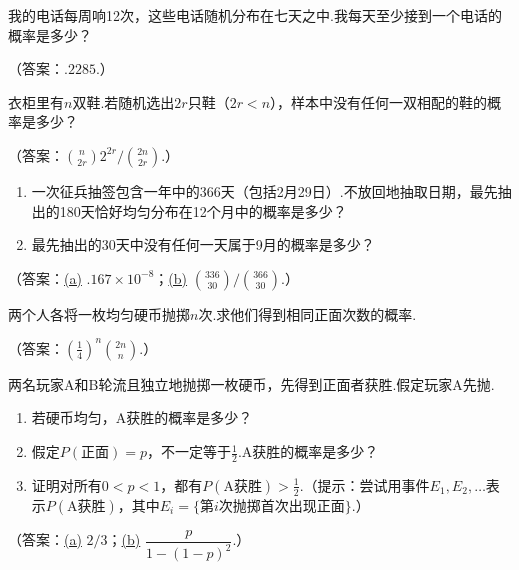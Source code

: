 \begin{exercise}\label{exercise:1.20}
我的电话每周响12次，这些电话随机分布在七天之中.我每天至少接到一个电话的概率是多少？

（答案：$.2285$.）
\end{exercise}

\begin{exercise}\label{exercise:1.21}
衣柜里有$n$双鞋.若随机选出$2r$只鞋（$2r<n$），样本中没有任何一双相配的鞋的概率是多少？

（答案：$\binom n{2r}2^{2r}/\binom{2n}{2r}$.）
\end{exercise}

\begin{exercise}\label{exercise:1.22}\leavevmode
\begin{enumerate}
\item[(a)]\label{itm:exercise:1.22:a} 一次征兵抽签包含一年中的366天（包括2月29日）.不放回地抽取日期，最先抽出的180天恰好均匀分布在12个月中的概率是多少？
\item[(b)]\label{itm:exercise:1.22:b} 最先抽出的30天中没有任何一天属于9月的概率是多少？
\end{enumerate}
（答案：\hyperref[itm:exercise:1.22:a]{(a)} $.167\times10^{-8}$；\hyperref[itm:exercise:1.22:b]{(b)} $\binom{336}{30}/\binom{366}{30}$.）
\end{exercise}

\begin{exercise}\label{exercise:1.23}
两个人各将一枚均匀硬币抛掷$n$次.求他们得到相同正面次数的概率.

（答案：$(\frac14)^n\binom{2n}{n}$.）
\end{exercise}

\begin{exercise}\label{exercise:1.24}
两名玩家A和B轮流且独立地抛掷一枚硬币，先得到正面者获胜.假定玩家A先抛.
\begin{enumerate}
\item[(a)]\label{itm:exercise:1.24:a} 若硬币均匀，A获胜的概率是多少？
\item[(b)]\label{itm:exercise:1.24:b} 假定$P(\text{正面})=p$，不一定等于$\frac12$.A获胜的概率是多少？
\item[(c)] 证明对所有$0<p<1$，都有$P(\mathrm{A}\text{获胜})>\frac12$.（提示：尝试用事件$E_1,E_2,\ldots$表示$P(\mathrm{A}\text{获胜})$，其中$E_i=\{\text{第}i\text{次抛掷首次出现正面}\}$.）
\end{enumerate}
（答案：\hyperref[itm:exercise:1.24:a]{(a)} $2/3$；\hyperref[itm:exercise:1.24:b]{(b)} $\dfrac{p}{1-(1-p)^2}$.）
\end{exercise}

